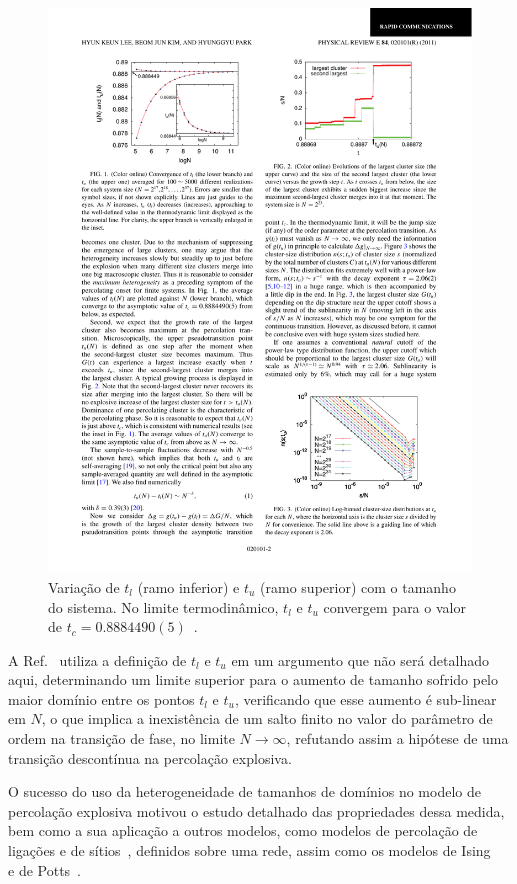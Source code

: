 \begin{figure}
 \centering
 \includegraphics[width=14cm]{img/tltu.pdf}
 \caption{Variação de $t_l$ (ramo inferior) e $t_u$ (ramo superior) com o tamanho do sistema. No limite termodinâmico, $t_l$ e $t_u$ convergem para o valor de $t_c = 0.8884490(5)$~\cite{LeeKimPark}.}
\label{fig.tltu}
\end{figure}

A Ref.~\cite{LeeKimPark} utiliza a definição de $t_l$ e $t_u$ em um argumento que não será detalhado aqui, determinando um limite superior para o aumento de tamanho sofrido pelo maior domínio entre os pontos $t_l$ e $t_u$, verificando que esse aumento é sub-linear em $N$, o que implica a inexistência de um salto finito no valor do parâmetro de ordem na transição de fase, no limite $N \rightarrow \infty$, refutando assim a hipótese de uma transição descontínua na percolação explosiva. 

O sucesso do uso da heterogeneidade de tamanhos de domínios no modelo de percolação explosiva motivou o estudo detalhado das propriedades dessa medida, bem como a sua aplicação a outros modelos, como modelos de percolação de ligações e de sítios~\cite{NohLeePark}, definidos sobre uma rede, assim como os modelos de Ising~~\cite{JoYiBaekKim} e de Potts~\cite{LvYangDeng}.


